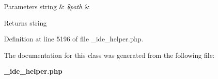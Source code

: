 \begin{DoxyParams}[1]{Parameters}
string & {\em \$path} & \\
\hline
\end{DoxyParams}
\begin{DoxyReturn}{Returns}
string 
\end{DoxyReturn}


Definition at line 5196 of file \+\_\+ide\+\_\+helper.\+php.



The documentation for this class was generated from the following file\+:\begin{DoxyCompactItemize}
\item 
{\bf \+\_\+ide\+\_\+helper.\+php}\end{DoxyCompactItemize}
